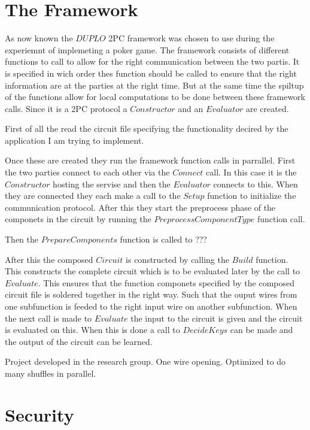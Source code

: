 \section{The Framework}


As now known the $DUPLO$ 2PC framework was chosen to use during the experiemnt of implemeting a poker game. The framework consists of different functions to call to allow for the right communication between the two partis. It is specified in wich order thes function should be called to ensure that the right information are at the parties at the right time. But at the same time the spiltup of the functions allow for local computations to be done between these framework calls. Since it is a 2PC protocol a $Constructor$ and an $Evaluator$ are created.

First of all the read the circuit file specifying the functionality decired by the application I am trying to implement.


Once these are created they run the framework function calls in parrallel. First the two parties connect to each other via the $Connect$ call. In this case it is the $Constructor$ hosting the servise and then the $Evaluator$ connects to this. When they are connected they each make a call to the $Setup$ function to initialize the communication protocol. After this they start the preprocess phase of the componets in the circuit by running the $PreprocessComponentType$ function call.


Then the $PrepareComponents$ function is called to ???


After this the composed $Circuit$ is constructed by calling the $Build$ function. This constructs the complete circuit which is to be evaluated later by the call to $Evaluate$. This ensures that the function componets specified by the composed circuit file is soldered together in the right way. Such that the ouput wires from one subfunction is feeded to the right input wire on another subfunction. When the next call is made to $Evaluate$ the input to the circuit is given and the circuit is evaluated on this. When this is done a call to $DecideKeys$ can be made and the output of the circuit can be learned.






Project developed in the research group.
One wire opening.
Optimized to do many shuffles in parallel.

\section{Security}